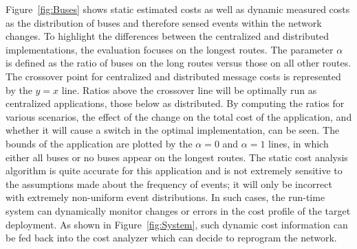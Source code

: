 Figure~\ref{fig:Buses} shows static estimated costs as well as dynamic measured
costs as the distribution of buses and therefore sensed events within the
network changes.  To highlight the differences between the centralized and
distributed implementations, the evaluation focuses on the longest routes. The
parameter $\alpha$ is defined as the ratio of buses on the long routes versus
those on all other routes.  The crossover point for centralized and distributed
message costs is represented by the $y=x$ line.  Ratios above the crossover line
will be optimally run as centralized applications, those below as distributed.
By computing the ratios for various scenarios, the effect of the change on the
total cost of the application, and whether it will cause a switch in the optimal
implementation, can be seen.  The bounds of the application are plotted by the
$\alpha = 0$ and $\alpha = 1$ lines, in which either all buses or no buses
appear on the longest routes. The static cost analysis algorithm is quite
accurate for this application and is not extremely sensitive to the assumptions
made about the frequency of events; it will only be incorrect with extremely
non-uniform event distributions.  In such cases, the run-time system can
dynamically monitor changes or errors in the cost profile of the target
deployment.  As shown in Figure~\ref{fig:System}, such dynamic cost information
can be fed back into the cost analyzer which can decide to reprogram the
network.

